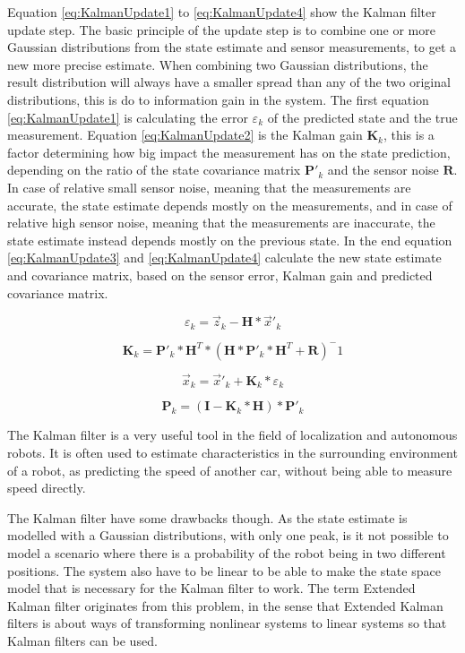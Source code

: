 Equation \ref{eq:KalmanUpdate1} to \ref{eq:KalmanUpdate4} show the Kalman filter update step.
The basic principle of the update step is to combine one or more Gaussian distributions from the state estimate and sensor measurements, to get a new more precise estimate.
When combining two Gaussian distributions, the result distribution will always have a smaller spread than any of the two original distributions, this is do to information gain in the system.
The first equation \ref{eq:KalmanUpdate1} is calculating the error $ \varepsilon_{k} $ of the predicted state and the true measurement.
Equation \ref{eq:KalmanUpdate2} is the Kalman gain $ \boldsymbol{K}_{k} $, this is a factor determining how big impact the measurement has on the state prediction, depending on the ratio of the state covariance matrix $\boldsymbol{P}'_{k}$ and the sensor noise $\boldsymbol{R}$.
In case of relative small sensor noise, meaning that the measurements are accurate, the state estimate depends mostly on the measurements, and in case of relative high sensor noise, meaning that the measurements are inaccurate, the state estimate instead depends mostly on the previous state.
In the end equation \ref{eq:KalmanUpdate3} and \ref{eq:KalmanUpdate4} calculate the new state estimate and covariance matrix, based on the sensor error, Kalman gain and predicted covariance matrix.

\begin{equation}
\label{eq:KalmanUpdate1}
\varepsilon_{k} = \vec{z}_{k} - \boldsymbol{H} * \vec{x}'_{k}
\end{equation}

\begin{equation}
\label{eq:KalmanUpdate2}
\boldsymbol{K}_{k} = \boldsymbol{P}'_{k} * \boldsymbol{H}^T * (\boldsymbol{H} * \boldsymbol{P}'_{k} * \boldsymbol{H}^T + \boldsymbol{R})^-1
\end{equation}

\begin{equation}
\label{eq:KalmanUpdate3}
\vec{x}_{k} = \vec{x}'_{k} + \boldsymbol{K}_{k} * \varepsilon_{k}
\end{equation}

\begin{equation}
\label{eq:KalmanUpdate4}
\boldsymbol{P}_{k} = (\boldsymbol{I} - \boldsymbol{K}_{k} * \boldsymbol{H}) * \boldsymbol{P}'_{k}
\end{equation}

The Kalman filter is a very useful tool in the field of localization and autonomous robots.
It is often used to estimate characteristics in the surrounding environment of a robot, as predicting the speed of another car, without being able to measure speed directly.

The Kalman filter have some drawbacks though.
As the state estimate is modelled with a Gaussian distributions, with only one peak, is it not possible to model a scenario where there is a probability of the robot being in two different positions.
The system also have to be linear to be able to make the state space model that is necessary for the Kalman filter to work.
The term Extended Kalman filter originates from this problem, in the sense that Extended Kalman filters is about ways of transforming nonlinear systems to linear systems so that Kalman filters can be used.